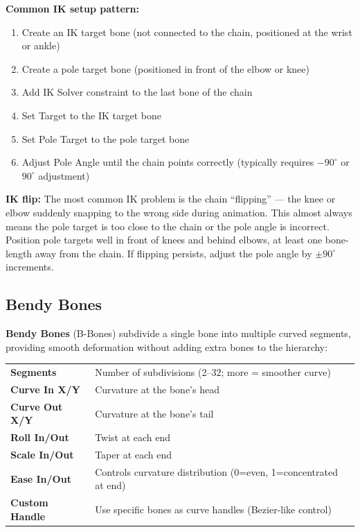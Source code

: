 \textbf{Common IK setup pattern:}

\begin{enumerate}[leftmargin=2em]
  \item Create an IK target bone (not connected to the chain, positioned at the wrist or ankle)
  \item Create a pole target bone (positioned in front of the elbow or knee)
  \item Add IK Solver constraint to the last bone of the chain
  \item Set Target to the IK target bone
  \item Set Pole Target to the pole target bone
  \item Adjust Pole Angle until the chain points correctly (typically requires $-90^\circ$ or $90^\circ$ adjustment)
\end{enumerate}

\begin{warningbox}
\textbf{IK flip:} The most common IK problem is the chain ``flipping'' --- the knee or elbow suddenly snapping to the wrong side during animation. This almost always means the pole target is too close to the chain or the pole angle is incorrect. Position pole targets well in front of knees and behind elbows, at least one bone-length away from the chain. If flipping persists, adjust the pole angle by $\pm 90^\circ$ increments.
\end{warningbox}

\subsection{Bendy Bones}
\label{subsec:bendy-bones}

\textbf{Bendy Bones} (B-Bones) subdivide a single bone into multiple curved segments, providing smooth deformation without adding extra bones to the hierarchy:

\begin{center}
\begin{tabularx}{\textwidth}{L{3cm}X}
\toprule
{}
 &  \\
\midrule
\textbf{Segments} & Number of subdivisions (2--32; more = smoother curve) \\
\textbf{Curve In X/Y} & Curvature at the bone's head \\
\textbf{Curve Out X/Y} & Curvature at the bone's tail \\
\textbf{Roll In/Out} & Twist at each end \\
\textbf{Scale In/Out} & Taper at each end \\
\textbf{Ease In/Out} & Controls curvature distribution (0=even, 1=concentrated at end) \\
\textbf{Custom Handle} & Use specific bones as curve handles (Bezier-like control) \\
\bottomrule
\end{tabularx}
\end{center}

